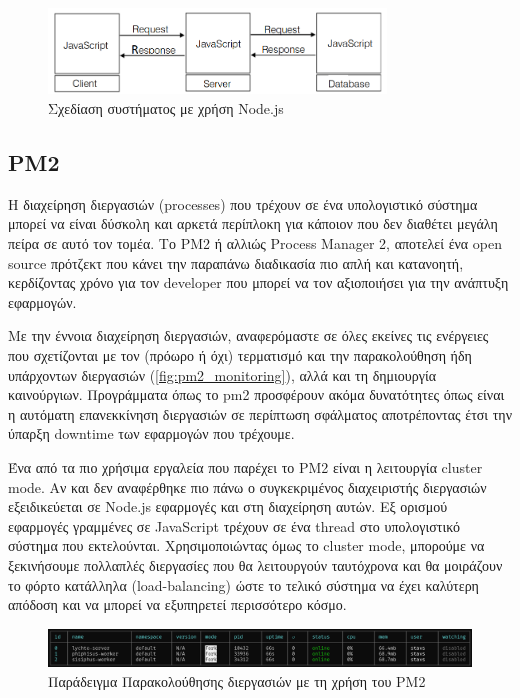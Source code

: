 \begin{figure}[!ht]
	\centering
	\includegraphics[width=0.8\textwidth]{./images/chapter2/javascript_end_to_end.png}
	\caption[Σχεδίαση συστήματος με χρήση Node.js]{Σχεδίαση συστήματος με χρήση Node.js \cite{nodejs_challenges_in_implementation}}
	\label{fig:nodejs_system}
\end{figure}

\subsection{PM2}
\label{subsec:pm2}

Η διαχείρηση διεργασιών (processes) που τρέχουν σε ένα υπολογιστικό σύστημα μπορεί να είναι δύσκολη
και αρκετά περίπλοκη για κάποιον που δεν διαθέτει μεγάλη πείρα σε αυτό τον τομέα. Το PM2 ή αλλιώς Process Manager 2,
αποτελεί ένα open source πρότζεκτ που κάνει την παραπάνω διαδικασία πιο απλή και κατανοητή, κερδίζοντας χρόνο
για τον developer που μπορεί να τον αξιοποιήσει για την ανάπτυξη εφαρμογών.

Με την έννοια διαχείρηση διεργασιών, αναφερόμαστε σε όλες εκείνες τις ενέργειες που σχετίζονται
με τον (πρόωρο ή όχι) τερματισμό και την παρακολούθηση ήδη υπάρχοντων διεργασιών (\autoref{fig:pm2_monitoring}), αλλά και τη δημιουργία καινούργιων.
Προγράμματα όπως το pm2 προσφέρουν ακόμα δυνατότητες όπως είναι η αυτόματη επανεκκίνηση διεργασιών σε περίπτωση σφάλματος
αποτρέποντας έτσι την ύπαρξη downtime των εφαρμογών που τρέχουμε.

Ένα από τα πιο χρήσιμα εργαλεία που παρέχει το PM2 είναι η λειτουργία cluster mode.
Αν και δεν αναφέρθηκε πιο πάνω ο συγκεκριμένος διαχειριστής διεργασιών εξειδικεύεται σε Node.js
εφαρμογές και στη διαχείρηση αυτών. Εξ ορισμού εφαρμογές γραμμένες σε JavaScript τρέχουν σε ένα thread
στο υπολογιστικό σύστημα που εκτελούνται. Χρησιμοποιώντας όμως το cluster mode, μπορούμε να
ξεκινήσουμε πολλαπλές διεργασίες που θα λειτουργούν ταυτόχρονα και θα μοιράζουν το φόρτο
κατάλληλα (load-balancing) ώστε το τελικό σύστημα να έχει καλύτερη απόδοση και να μπορεί να εξυπηρετεί 
περισσότερο κόσμο. 

\begin{figure}[!ht]
	\centering
	\includegraphics[width=1\textwidth]{./images/chapter2/pm2_monitoring.png}
	\caption[Παράδειγμα Παρακολούθησης διεργασιών με τη χρήση του PM2]{Παράδειγμα Παρακολούθησης διεργασιών με τη χρήση του PM2}
	\label{fig:pm2_monitoring}
\end{figure}

